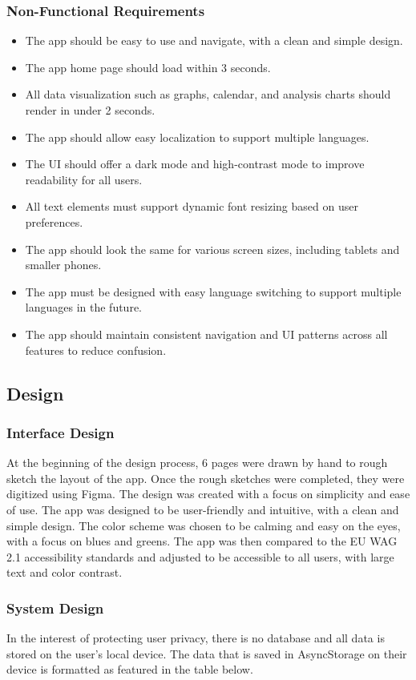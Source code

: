 \subsubsection{Non-Functional Requirements}
\begin{itemize}
  \item The app should be easy to use and navigate, with a clean and simple design.
  \item The app home page should load within 3 seconds.
  \item All data visualization such as graphs, calendar, and analysis charts should render in under 2 seconds.
  \item The app should allow easy localization to support multiple languages.
  \item The UI should offer a dark mode and high-contrast mode to improve readability for all users.
  \item All text elements must support dynamic font resizing based on user preferences.
  \item The app should look the same for various screen sizes, including tablets and smaller phones.
  \item The app must be designed with easy language switching to support multiple languages in the future.
  \item The app should maintain consistent navigation and UI patterns across all features to reduce confusion.
\end{itemize}

\subsection{Design}

\subsubsection{Interface Design}
At the beginning of the design process, 6 pages were drawn by hand to rough sketch the layout of the app. Once the rough sketches were completed, they were digitized using Figma. The design was created with a focus on simplicity and ease of use. The app was designed to be user-friendly and intuitive, with a clean and simple design. The color scheme was chosen to be calming and easy on the eyes, with a focus on blues and greens. The app was then compared to the EU WAG 2.1 accessibility standards and adjusted to be accessible to all users, with large text and color contrast. 

\subsubsection{System Design}
In the interest of protecting user privacy, there is no database and all data is stored on the user's local device. The data that is saved in AsyncStorage on their device is formatted as featured in the table below.

